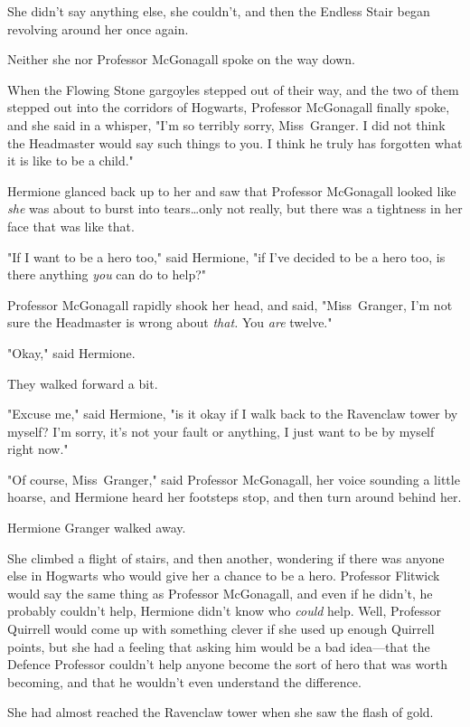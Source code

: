 She didn't say anything else, she couldn't, and then the Endless Stair began
revolving around her once again.

Neither she nor Professor McGonagall spoke on the way down.

When the Flowing Stone gargoyles stepped out of their way, and the two of them
stepped out into the corridors of Hogwarts, Professor McGonagall finally spoke,
and she said in a whisper, "I'm so terribly sorry, Miss~Granger. I did not
think the Headmaster would say such things to you. I think he truly has
forgotten what it is like to be a child."

Hermione glanced back up to her and saw that Professor McGonagall looked like
\emph{she} was about to burst into tears…only not really, but there was
a tightness in her face that was like that.

"If I want to be a hero too," said Hermione, "if I've decided to be a hero too,
is there anything \emph{you} can do to help?"

Professor McGonagall rapidly shook her head, and said, "Miss~Granger, I'm not
sure the Headmaster is wrong about \emph{that.} You \emph{are} twelve."

"Okay," said Hermione.

They walked forward a bit.

"Excuse me," said Hermione, "is it okay if I walk back to the Ravenclaw tower
by myself? I'm sorry, it's not your fault or anything, I just want to be by
myself right now."

"Of course, Miss~Granger," said Professor McGonagall, her voice sounding a
little hoarse, and Hermione heard her footsteps stop, and then turn around
behind her.

Hermione Granger walked away.

She climbed a flight of stairs, and then another, wondering if there was anyone
else in Hogwarts who would give her a chance to be a hero. Professor Flitwick
would say the same thing as Professor McGonagall, and even if he didn't, he
probably couldn't help, Hermione didn't know who \emph{could} help. Well,
Professor Quirrell would come up with something clever if she used up enough
Quirrell points, but she had a feeling that asking him would be a bad
idea---that the Defence Professor couldn't help anyone become the sort of hero
that was worth becoming, and that he wouldn't even understand the difference.

She had almost reached the Ravenclaw tower when she saw the flash of gold.
